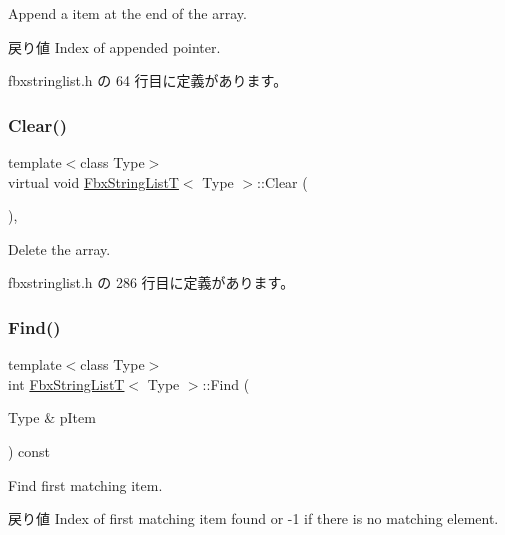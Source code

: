 Append a item at the end of the array. \begin{DoxyReturn}{戻り値}
Index of appended pointer. 
\end{DoxyReturn}


 fbxstringlist.\+h の 64 行目に定義があります。

\mbox{\label{class_fbx_string_list_t_ac5bcede97ed831d4fe76f3087a63398e}} 
\subsubsection{\texorpdfstring{Clear()}{Clear()}}
{\footnotesize\ttfamily template$<$class Type$>$ \\
virtual void \hyperlink{class_fbx_string_list_t}{Fbx\+String\+ListT}$<$ Type $>$\+::Clear (\begin{DoxyParamCaption}{ }\end{DoxyParamCaption})\hspace{0.3cm}{\ttfamily [inline]}, {\ttfamily [virtual]}}



Delete the array. 



 fbxstringlist.\+h の 286 行目に定義があります。

\mbox{\label{class_fbx_string_list_t_a537eb6d3e7568488280c9cf6fd37899f}} 
\subsubsection{\texorpdfstring{Find()}{Find()}}
{\footnotesize\ttfamily template$<$class Type$>$ \\
int \hyperlink{class_fbx_string_list_t}{Fbx\+String\+ListT}$<$ Type $>$\+::Find (\begin{DoxyParamCaption}\item[{Type \&}]{p\+Item }\end{DoxyParamCaption}) const\hspace{0.3cm}{\ttfamily [inline]}}

Find first matching item. \begin{DoxyReturn}{戻り値}
Index of first matching item found or -\/1 if there is no matching element. 
\end{DoxyReturn}


